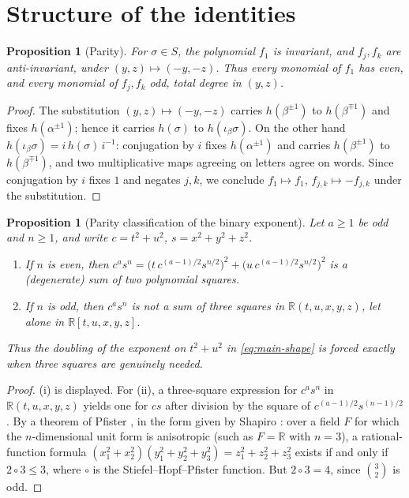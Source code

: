 \documentclass[11pt]{article}
\newtheorem{proposition}[theorem]{Proposition}
\theoremstyle{definition}
\theoremstyle{remark}
\newcommand{\RR}{\mathbb{R}}
\newcommand{\ib}{\iota_\beta}
\begin{document}
\section{Structure of the identities}\label{sec:structure}

\begin{proposition}[Parity]\label{prop:parity}
For $\sigma\in S$, the polynomial $f_1$ is invariant, and $f_j,f_k$ are anti-invariant, under $(y,z)\mapsto(-y,-z)$. Thus every monomial of $f_1$ has even, and every monomial of $f_j,f_k$ odd, total degree in $(y,z)$.
\end{proposition}

\begin{proof}
The substitution $(y,z)\mapsto(-y,-z)$ carries $h(\beta^{\pm1})$ to $h(\beta^{\mp1})$ and fixes $h(\alpha^{\pm1})$; hence it carries $h(\sigma)$ to $h(\ib\sigma)$. On the other hand $h(\ib\sigma)=i\,h(\sigma)\,i^{-1}$: conjugation by $i$ fixes $h(\alpha^{\pm1})$ and carries $h(\beta^{\pm1})$ to $h(\beta^{\mp1})$, and two multiplicative maps agreeing on letters agree on words. Since conjugation by $i$ fixes $1$ and negates $j,k$, we conclude $f_1\mapsto f_1$, $f_{j,k}\mapsto -f_{j,k}$ under the substitution.
\end{proof}

\begin{proposition}[Parity classification of the binary exponent]\label{prop:no-first-power}
Let $a\ge1$ be odd and $n\ge1$, and write $c=t^2+u^2$, $s=x^2+y^2+z^2$.
\begin{enumerate}
\item[(i)] If $n$ is even, then $c^{a}s^{n}=\bigl(t\,c^{(a-1)/2}s^{n/2}\bigr)^2+\bigl(u\,c^{(a-1)/2}s^{n/2}\bigr)^2$ is a (degenerate) sum of two polynomial squares.
\item[(ii)] If $n$ is odd, then $c^{a}s^{n}$ is not a sum of three squares in $\RR(t,u,x,y,z)$, let alone in $\RR[t,u,x,y,z]$.
\end{enumerate}
Thus the doubling of the exponent on $t^2+u^2$ in \eqref{eq:main-shape} is forced exactly when three squares are genuinely needed.
\end{proposition}

\begin{proof}
(i) is displayed. For (ii), a three-square expression for $c^as^n$ in $\RR(t,u,x,y,z)$ yields one for $cs$ after division by the square of $c^{(a-1)/2}s^{(n-1)/2}$. By a theorem of Pfister \cite[Satz~3 and its Folgerung]{Pfister}, in the form given by Shapiro \cite[Prop.~14.6 and Thm.~14.8]{ShapiroBook}: over a field $F$ for which the $n$-dimensional unit form is anisotropic (such as $F=\RR$ with $n=3$), a rational-function formula $(x_1^2+x_2^2)(y_1^2+y_2^2+y_3^2)=z_1^2+z_2^2+z_3^2$ exists if and only if $2\circ3\le3$, where $\circ$ is the Stiefel--Hopf--Pfister function. But $2\circ3=4$, since $\binom{3}{2}$ is odd.
\end{proof}
\end{document}
